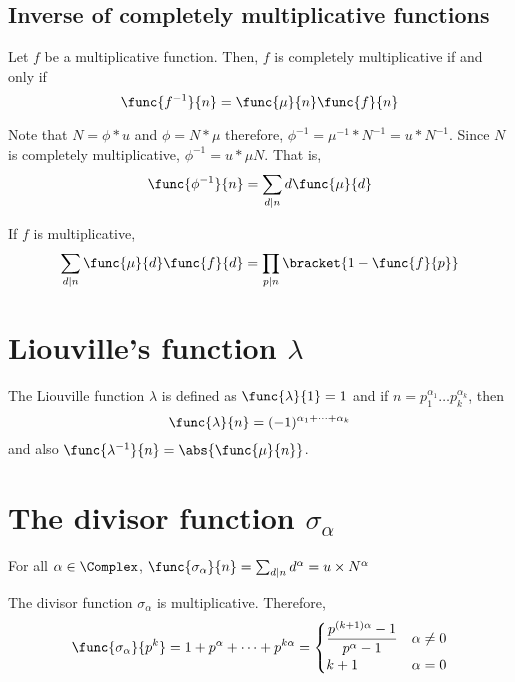 \subsection{Inverse of completely multiplicative functions}
\begin{theorem}
    Let \(f\) be a multiplicative function. Then, \(f\) is completely multiplicative if and only if 
    \begin{equation*}
        \func{f^{-1}}{n} = \func{\mu}{n} \func{f}{n}
    \end{equation*}
\end{theorem}
\begin{remark}
    Note that \(N = \phi \ast u\) and \(\phi = N \ast \mu\) therefore, \(\phi^{-1}= \mu^{-1} \ast N^{-1} = u \ast N^{-1}\). Since \(N\) is completely multiplicative, \(\phi^{-1} = u \ast \mu N\). That is, 
    \begin{equation*}
        \func{\phi^{-1}}{n} = \sum_{d \mid n} d \func{\mu}{d}
    \end{equation*}
\end{remark}
\begin{theorem}
    If \(f\) is multiplicative,
    \begin{equation*}
        \sum_{d \mid n} \func{\mu}{d} \func{f}{d} = \prod_{p \mid n} \bracket{1 - \func{f}{p}}
    \end{equation*}
\end{theorem}
\section{Liouville's function \(\lambda\)}
\begin{definition}
    The Liouville function \(\lambda\) is defined as \(\func{\lambda}{1} = 1\) and if \(n = p_1^{\alpha_1} \dots p_k^{\alpha_k}\), then 
    \begin{equation*}
        \func{\lambda}{n} = (-1)^{\alpha_1 + \dots + \alpha_k}
    \end{equation*}
    and also \(\func{\lambda^{-1}}{n} = \abs{\func{\mu}{n}}\).
\end{definition}
\section{The divisor function \(\sigma_{\alpha}\)}
\begin{definition}
    For all \(\alpha \in \Complex\), \(\func{\sigma_{\alpha}}{n} = \sum_{d \mid n} d^{\alpha} = u \times N^{\alpha}\)
\end{definition}
\begin{proposition}
    The divisor function \(\sigma_{\alpha}\) is multiplicative. Therefore,
    \begin{equation*}
        \func{\sigma_{\alpha}}{p^k} = 1 + p^{\alpha} + \dots + p^{k \alpha} = \begin{cases}
            \dfrac{p^{(k+1)\alpha} - 1}{p^{\alpha} - 1} & \alpha \neq 0\\
            k + 1 & \alpha = 0
        \end{cases}
    \end{equation*}
\end{proposition}

